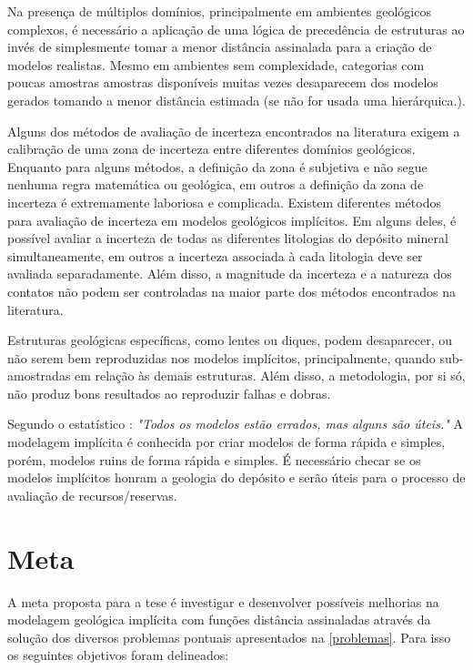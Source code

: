 Na presença de múltiplos domínios, principalmente em ambientes geológicos complexos, é necessário a aplicação de uma lógica de precedência de estruturas ao invés de simplesmente tomar a menor distância assinalada para a criação de modelos realistas. Mesmo em ambientes sem complexidade, categorias com poucas amostras amostras disponíveis muitas vezes desaparecem dos modelos gerados tomando a menor distância estimada (se não for usada uma hierárquica.).

Alguns dos métodos de avaliação de incerteza encontrados na literatura exigem a calibração de uma zona de incerteza entre diferentes domínios geológicos. Enquanto para alguns métodos, a definição da zona é subjetiva e não segue nenhuma regra matemática ou geológica, em outros a definição da zona de incerteza é extremamente laboriosa e complicada.
Existem diferentes métodos para avaliação de incerteza em modelos geológicos implícitos. Em alguns deles, é possível avaliar a incerteza de todas as diferentes litologias do depósito mineral simultaneamente, em outros a incerteza associada à cada litologia deve ser avaliada separadamente. Além disso, a magnitude da incerteza e a natureza dos contatos não podem ser controladas na maior parte dos métodos encontrados na literatura.

Estruturas geológicas específicas, como lentes ou diques, podem desaparecer, ou não serem bem reproduzidas nos modelos implícitos, principalmente, quando sub-amostradas em relação às demais estruturas. Além disso, a metodologia, por si só, não produz bons resultados ao reproduzir falhas e dobras. 

Segundo o estatístico : \textit{"Todos os modelos estão errados, mas alguns são úteis."} A modelagem implícita é conhecida por criar modelos de forma rápida e simples, porém, modelos ruins de forma rápida e simples. É necessário checar se os modelos implícitos honram a geologia do depósito e serão úteis para o processo de avaliação de recursos/reservas. 

\section{Meta}

A meta proposta para a tese é investigar e desenvolver possíveis melhorias na modelagem geológica implícita com funções distância assinaladas através da solução dos diversos problemas pontuais apresentados na \autoref{problemas}. Para isso os seguintes objetivos foram delineados:

